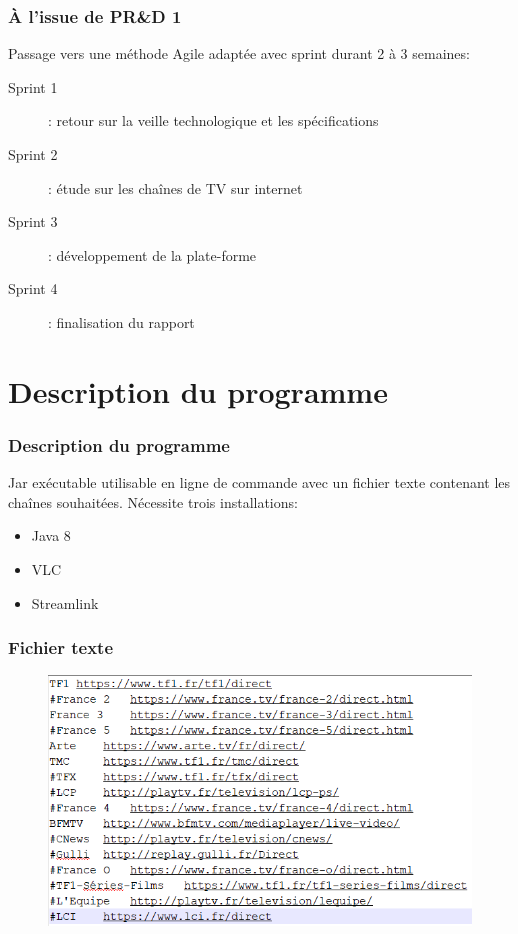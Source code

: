 \documentclass{beamer}
\begin{document}
\begin{frame}
\frametitle{À l'issue de PR\&D 1}

Passage vers une méthode Agile adaptée avec sprint durant 2 à 3 semaines:

\begin{description}
	\item[Sprint 1]: retour sur la veille technologique et les spécifications
	\item[Sprint 2]: étude sur les chaînes de TV sur internet
	\item[Sprint 3]: développement de la plate-forme
	\item[Sprint 4]: finalisation du rapport
\end{description}


\end{frame}


\section{Description du programme}

\begin{frame}

\frametitle{Description du programme}

Jar exécutable utilisable en ligne de commande avec un fichier texte contenant les chaînes souhaitées.
\bigbreak
Nécessite trois installations:
\begin{itemize}
	\item Java 8
	\item VLC
	\item Streamlink
\end{itemize}

\end{frame}


\begin{frame}
\frametitle{Fichier texte}

\begin{figure}
	\includegraphics[scale=0.75]{images/textfile}
\end{figure}

\end{frame}
\end{document}
